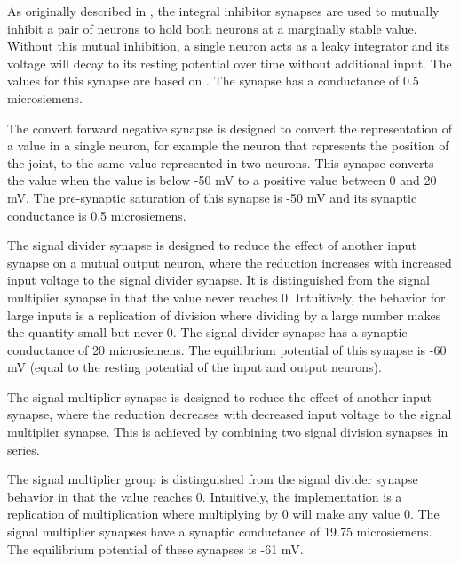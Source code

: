 
As originally described in \cite{NickFunctionalSubnetwork}, the integral inhibitor synapses are used to mutually inhibit a pair of neurons to hold both 
neurons at a marginally stable value. Without this mutual inhibition, a single neuron acts
as a leaky integrator and its voltage will decay to its resting potential over time without additional input.  The values for this
synapse are based on \cite{NickFunctionalSubnetwork}. The synapse has a  
conductance of 0.5 microsiemens.


The convert forward negative synapse is designed to convert the representation
of a value in a single neuron, for example the neuron that represents the 
position of the joint, to the same value represented in two neurons. This
synapse converts the value when the value is below -50 mV to a positive value 
between 0 and 20 mV. The pre-synaptic
saturation of this synapse is -50 mV and its synaptic conductance is 0.5 microsiemens.


The signal divider synapse is designed to reduce the effect of another input
synapse on a mutual output neuron, where the reduction increases with increased input voltage to the
signal divider synapse. It is distinguished from the signal multiplier synapse
in that the value never reaches 0. Intuitively, the behavior for large inputs is a replication of 
division where dividing by a large number makes the quantity small but never 0.
The signal divider synapse has a synaptic conductance of 20 microsiemens. The equilibrium potential of
this synapse is -60 mV (equal to the resting potential of the input and output
neurons).


The signal multiplier synapse is designed to reduce the effect of another input
synapse, where the reduction decreases with decreased input voltage to the
signal multiplier synapse.  This is achieved by combining two signal division synapses in series.

The signal multiplier group is distinguished from the signal divider synapse
behavior in that the value reaches 0. Intuitively, the implementation is a replication of 
multiplication where multiplying by 0 will make any value 0.
The signal multiplier synapses have a synaptic conductance of 19.75 microsiemens. The equilibrium potential 
of these synapses is -61 mV.

